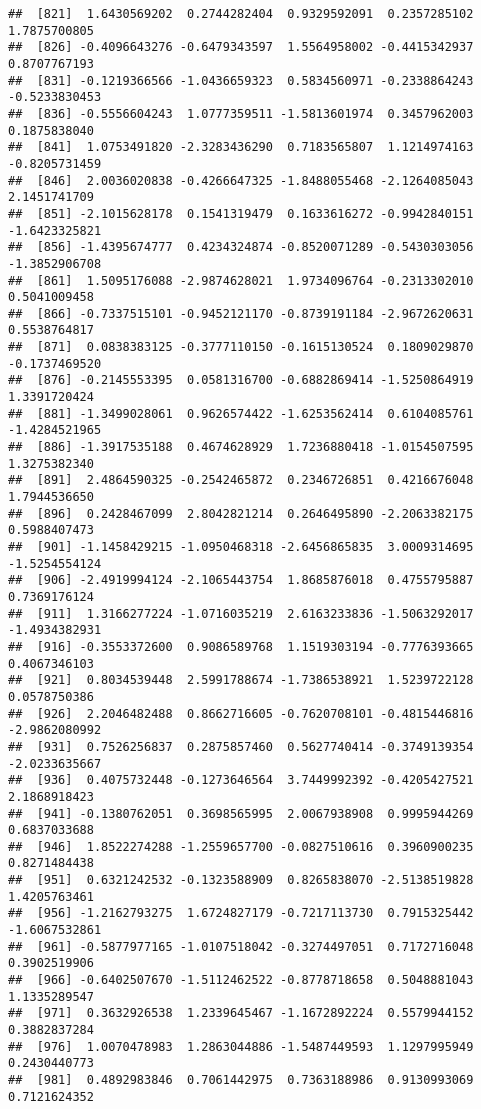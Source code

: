\documentclass[
]{article}
\begin{document}
\begin{verbatim}
##  [821]  1.6430569202  0.2744282404  0.9329592091  0.2357285102  1.7875700805
##  [826] -0.4096643276 -0.6479343597  1.5564958002 -0.4415342937  0.8707767193
##  [831] -0.1219366566 -1.0436659323  0.5834560971 -0.2338864243 -0.5233830453
##  [836] -0.5556604243  1.0777359511 -1.5813601974  0.3457962003  0.1875838040
##  [841]  1.0753491820 -2.3283436290  0.7183565807  1.1214974163 -0.8205731459
##  [846]  2.0036020838 -0.4266647325 -1.8488055468 -2.1264085043  2.1451741709
##  [851] -2.1015628178  0.1541319479  0.1633616272 -0.9942840151 -1.6423325821
##  [856] -1.4395674777  0.4234324874 -0.8520071289 -0.5430303056 -1.3852906708
##  [861]  1.5095176088 -2.9874628021  1.9734096764 -0.2313302010  0.5041009458
##  [866] -0.7337515101 -0.9452121170 -0.8739191184 -2.9672620631  0.5538764817
##  [871]  0.0838383125 -0.3777110150 -0.1615130524  0.1809029870 -0.1737469520
##  [876] -0.2145553395  0.0581316700 -0.6882869414 -1.5250864919  1.3391720424
##  [881] -1.3499028061  0.9626574422 -1.6253562414  0.6104085761 -1.4284521965
##  [886] -1.3917535188  0.4674628929  1.7236880418 -1.0154507595  1.3275382340
##  [891]  2.4864590325 -0.2542465872  0.2346726851  0.4216676048  1.7944536650
##  [896]  0.2428467099  2.8042821214  0.2646495890 -2.2063382175  0.5988407473
##  [901] -1.1458429215 -1.0950468318 -2.6456865835  3.0009314695 -1.5254554124
##  [906] -2.4919994124 -2.1065443754  1.8685876018  0.4755795887  0.7369176124
##  [911]  1.3166277224 -1.0716035219  2.6163233836 -1.5063292017 -1.4934382931
##  [916] -0.3553372600  0.9086589768  1.1519303194 -0.7776393665  0.4067346103
##  [921]  0.8034539448  2.5991788674 -1.7386538921  1.5239722128  0.0578750386
##  [926]  2.2046482488  0.8662716605 -0.7620708101 -0.4815446816 -2.9862080992
##  [931]  0.7526256837  0.2875857460  0.5627740414 -0.3749139354 -2.0233635667
##  [936]  0.4075732448 -0.1273646564  3.7449992392 -0.4205427521  2.1868918423
##  [941] -0.1380762051  0.3698565995  2.0067938908  0.9995944269  0.6837033688
##  [946]  1.8522274288 -1.2559657700 -0.0827510616  0.3960900235  0.8271484438
##  [951]  0.6321242532 -0.1323588909  0.8265838070 -2.5138519828  1.4205763461
##  [956] -1.2162793275  1.6724827179 -0.7217113730  0.7915325442 -1.6067532861
##  [961] -0.5877977165 -1.0107518042 -0.3274497051  0.7172716048  0.3902519906
##  [966] -0.6402507670 -1.5112462522 -0.8778718658  0.5048881043  1.1335289547
##  [971]  0.3632926538  1.2339645467 -1.1672892224  0.5579944152  0.3882837284
##  [976]  1.0070478983  1.2863044886 -1.5487449593  1.1297995949  0.2430440773
##  [981]  0.4892983846  0.7061442975  0.7363188986  0.9130993069  0.7121624352

\end{verbatim}
\end{document}

